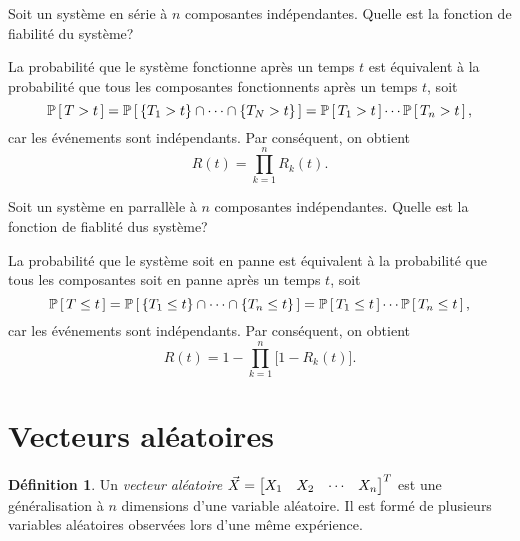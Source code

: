 \documentclass[11pt]{article}
\makeatletter
\renewcommand\P[1]{%
	\ensuremath{%
		\mathbb{P}\left[\,#1\,\right]%
	}%
}%
\newcommand\invec[1]{%
	\ensuremath{%
		\left[%
			\begin{matrix}%
				#1%
			\end{matrix}%
		\right]^T%
	}%
}%
\theoremstyle{remark}
\theoremstyle{definition}
\newtheorem*{@definition}{Définition}
\newenvironment{definition}{%
	\begin{@definition}%
}{%
	\end{@definition}%
	\setcounter{property}{0}%
}
\makeatother
\begin{document}
\begin{exemple}
	Soit un système en série à $n$ composantes indépendantes. Quelle est la
	fonction de fiabilité du système?

	La probabilité que le système fonctionne après un temps $t$ est équivalent
	à la probabilité que tous les composantes fonctionnents après un temps $t$,
	soit
	\begin{equation*}
		\P{T>t}
		=\P{\left\{T_1>t\right\}\cap\cdots\cap\left\{T_N>t\right\}}
		=\P{T_1>t}\cdots\P{T_n>t},
	\end{equation*}
	car les événements sont indépendants. Par conséquent, on obtient
	\begin{equation*}
		R(t)=\prod_{k=1}^n R_k(t).
	\end{equation*}
\end{exemple}

\begin{exemple}
	Soit un système en parrallèle à $n$ composantes indépendantes. Quelle est
	la fonction de fiablité dus système?

	La probabilité que le système soit en panne est équivalent à la probabilité
	que tous les composantes soit en panne après un temps $t$, soit
	\begin{equation*}
		\P{T\leq t}
		=\P{\left\{T_1\leq t\right\}\cap\cdots\cap\left\{T_n\leq t\right\}}
		=\P{T_1\leq t}\cdots\P{T_n\leq t},
	\end{equation*}
	car les événements sont indépendants. Par conséquent, on obtient
	\begin{equation*}
		R(t)=1-\prod_{k=1}^n\bigg[1-R_k(t)\bigg].
	\end{equation*}
\end{exemple}

\section{Vecteurs aléatoires}
\begin{definition}
	Un \textit{vecteur aléatoire} $\vec{X}=\invec{X_1&X_2&\cdots&X_n}$ est une
	généralisation à $n$ dimensions d'une variable aléatoire. Il est formé de
	plusieurs variables aléatoires observées lors d'une même expérience.
\end{definition}
\end{document}
